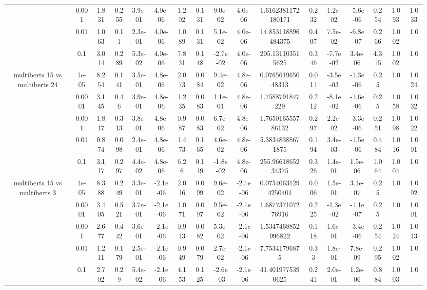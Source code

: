 \begin{tabular}{|c|c|c|c|c|c|c|c|c|c|c|c|c|c|c|c|c|}
 & 0.001 & 1.831 & 0.255 & 3.9e-01 & 4.0e-06 & 1.202 & 0.131 & 9.0e-02 & 4.0e-06 & 1.6162381172180171 & 0.232 & 1.2e-02 & -5.6e-06 & 0.254 & 1.093 & 1.033 \\
 & 0.01 & 1.063 & 0.11 & 2.3e-01 & 4.0e-06 & 1.089 & 0.131 & 5.1e-02 & 4.0e-06 & 14.853118896484375 & 0.407 & 7.5e-02 & -6.8e-07 & 0.266 & 1.002 & 1.0 \\
 & 0.1 & 3.014 & 0.289 & 5.3e-02 & 4.0e-06 & 7.831 & 0.148 & -2.7e-02 & 4.0e-06 & 205.131103515625 & 0.346 & -7.7e-02 & 3.4e-06 & 4.315 & 1.002 & 1.0 \\
\hline
\multirow{5}{*}{multiberts 15 vs multiberts 24} & 1e-05 & 8.254 & 0.141 & 3.5e-01 & 4.8e-06 & 2.073 & 0.084 & 9.4e-02 & 4.8e-06 & 0.076561965048313 & 0.011 & -3.5e-03 & -1.3e-06 & 0.25 & 1.0 & 1.024 \\
 & 0.0001 & 3.145 & 0.46 & 3.9e-01 & 4.8e-06 & 1.235 & 0.083 & 1.1e-01 & 4.8e-06 & 1.7588791847229 & 0.212 & -8.1e-02 & -1.6e-06 & 0.25 & 1.058 & 1.032 \\
 & 0.001 & 1.817 & 0.313 & 3.8e-01 & 4.8e-06 & 0.987 & 0.083 & 6.7e-02 & 4.8e-06 & 1.765016555786132 & 0.297 & 2.2e-02 & -3.3e-06 & 0.251 & 1.098 & 1.022 \\
 & 0.01 & 0.874 & 0.098 & 2.4e-01 & 4.8e-06 & 1.473 & 0.165 & 4.6e-02 & 4.8e-06 & 5.38348388671875 & 0.194 & 3.4e-03 & -1.5e-06 & 0.484 & 1.016 & 1.001 \\
 & 0.1 & 3.117 & 0.297 & 4.4e-02 & 4.8e-06 & 6.26 & 0.119 & -1.8e-02 & 4.8e-06 & 255.9661865234375 & 0.326 & 1.4e-01 & 1.5e-06 & 1.064 & 1.004 & 1.0 \\
\hline
\multirow{5}{*}{multiberts 15 vs multiberts 3} & 1e-05 & 8.388 & 0.249 & 3.3e-01 & -2.1e-06 & 2.016 & 0.099 & 9.6e-02 & -2.1e-06 & 0.07540631294250401 & 0.006 & 1.5e-01 & 3.1e-07 & 0.25 & 1.0 & 1.002 \\
 & 0.0001 & 3.405 & 0.521 & 3.7e-01 & -2.1e-06 & 1.071 & 0.097 & 9.5e-02 & -2.1e-06 & 1.687737107276916 & 0.225 & -1.3e-02 & -1.1e-07 & 0.25 & 1.0 & 1.001 \\
 & 0.001 & 2.677 & 0.442 & 3.6e-01 & -2.1e-06 & 0.913 & 0.082 & 5.3e-02 & -2.1e-06 & 1.5347468852996822 & 0.118 & 1.6e-01 & -3.4e-06 & 0.254 & 1.024 & 1.013 \\
 & 0.01 & 1.211 & 0.179 & 2.5e-01 & -2.1e-06 & 0.949 & 0.079 & 2.7e-02 & -2.1e-06 & 7.75341796875 & 0.33 & 1.8e-01 & 7.8e-09 & 0.295 & 1.002 & 1.0 \\
 & 0.1 & 2.702 & 0.29 & 5.4e-02 & -2.1e-06 & 4.153 & 0.125 & -2.6e-03 & -2.1e-06 & 41.4019775390625 & 0.241 & 2.0e-01 & 1.2e-06 & 0.884 & 1.003 & 1.0 \\

\end{tabular}

